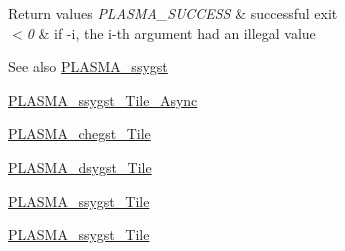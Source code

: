 \begin{DoxyRetVals}{Return values}
{\em P\+L\+A\+S\+M\+A\+\_\+\+S\+U\+C\+C\+E\+S\+S} & successful exit \\
\hline
{\em $<$0} & if -\/i, the i-\/th argument had an illegal value\\
\hline
\end{DoxyRetVals}
\begin{DoxySeeAlso}{See also}
\hyperlink{group__float_ga66b77c0de44f80760c4184756250e75e_ga66b77c0de44f80760c4184756250e75e}{P\+L\+A\+S\+M\+A\+\_\+ssygst} 

\hyperlink{group__float__Tile__Async_ga0ba80975dba7d12181f27baaae46c3eb_ga0ba80975dba7d12181f27baaae46c3eb}{P\+L\+A\+S\+M\+A\+\_\+ssygst\+\_\+\+Tile\+\_\+\+Async} 

\hyperlink{group__PLASMA__Complex32__t__Tile_ga4315d3e8b6248219e35e1d181dd13b68_ga4315d3e8b6248219e35e1d181dd13b68}{P\+L\+A\+S\+M\+A\+\_\+chegst\+\_\+\+Tile} 

\hyperlink{group__double__Tile_ga3500cf0cf6d6b233f3f1078d5f5057d8_ga3500cf0cf6d6b233f3f1078d5f5057d8}{P\+L\+A\+S\+M\+A\+\_\+dsygst\+\_\+\+Tile} 

\hyperlink{group__float__Tile_ga47edc276e115a0eb253b2a4bda9a3b9e_ga47edc276e115a0eb253b2a4bda9a3b9e}{P\+L\+A\+S\+M\+A\+\_\+ssygst\+\_\+\+Tile} 

\hyperlink{group__float__Tile_ga47edc276e115a0eb253b2a4bda9a3b9e_ga47edc276e115a0eb253b2a4bda9a3b9e}{P\+L\+A\+S\+M\+A\+\_\+ssygst\+\_\+\+Tile} 
\end{DoxySeeAlso}
\hypertarget{group__float__Tile_gaf4fce913d91be59999ba6a842ec1ad8d_gaf4fce913d91be59999ba6a842ec1ad8d}{}
